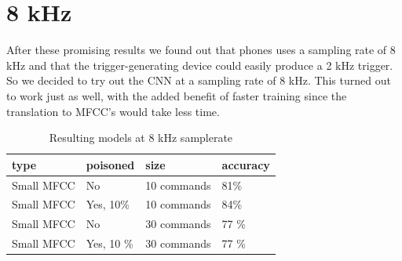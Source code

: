 \documentclass{report}
\theoremstyle{definition}
\theoremstyle{remark}
\begin{document}
\section{8 kHz}
After these promising results we found out that phones uses a sampling rate of 8 kHz and that the trigger-generating device could easily produce a 2 kHz trigger. So we decided to try out the CNN at a sampling rate of 8 kHz. This turned out to work just as well, with the added benefit of faster training since the translation to MFCC's would take less time.

\begin{table}[!hbt]
\centering
\begin{tabular}{|l|l|l|l|}
\hline
type & poisoned & size & accuracy \\ \hline
Small MFCC & No  &  10 commands  &  81\% \\ \hline
Small MFCC & Yes, 10\%  &  10 commands  & 84\%          \\ \hline
Small MFCC & No  &  30 commands  &  77 \%       \\ \hline
Small MFCC & Yes, 10 \%  &  30 commands  &  77 \%       \\ \hline
\end{tabular}
\caption{Resulting models at 8 kHz samplerate}
\end{table}
\end{document}
